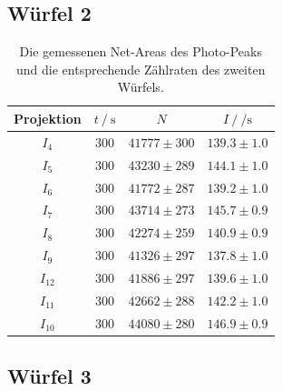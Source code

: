 \subsection{Würfel 2}

\begin{table}[H]
  \centering
  \begin{tabular}{c c c c}
    \toprule
     Projektion &  $t \:/\: \si{\second}$ &     $N$ &           $I \:/\: \si{\per\second}$ \\
    \midrule
            $I_{  4}$ &   $300$ & $41777 \pm    300$ & $139.3\pm1.0$ \\
            $I_{  5}$ &   $300$ & $43230 \pm    289$ & $144.1\pm1.0$ \\
            $I_{  6}$ &   $300$ & $41772 \pm    287$ & $139.2\pm1.0$ \\
            $I_{  7}$ &   $300$ & $43714 \pm    273$ & $145.7\pm0.9$ \\
            $I_{  8}$ &   $300$ & $42274 \pm    259$ & $140.9\pm0.9$ \\
            $I_{  9}$ &   $300$ & $41326 \pm    297$ & $137.8\pm1.0$ \\
            $I_{ 12}$ &   $300$ & $41886 \pm    297$ & $139.6\pm1.0$ \\
            $I_{ 11}$ &   $300$ & $42662 \pm    288$ & $142.2\pm1.0$ \\
            $I_{ 10}$ &   $300$ & $44080 \pm    280$ & $146.9\pm0.9$ \\
    \bottomrule
    \end{tabular}
  \caption{Die gemessenen Net-Areas des Photo-Peaks und die entsprechende Zählraten des zweiten Würfels. }
  \label{tab:w2}
\end{table}

\subsection{Würfel 3}

